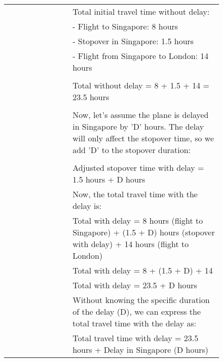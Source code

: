 \begin{figure}[!t]
{\begin{tabular}{>{\raggedleft\arraybackslash}p{0.3\linewidth} p{0.7\linewidth}}
    & Total initial travel time without delay: \\
    & - Flight to Singapore: 8 hours \\
    & - Stopover in Singapore: 1.5 hours \\
    & - Flight from Singapore to London: 14 hours \\ \\
    & Total without delay = 8 + 1.5 + 14 = 23.5 hours \\ \\
    & Now, let's assume the plane is delayed in Singapore by 'D' hours. The delay will only affect the stopover time, so we add 'D' to the stopover duration: \\ \\
    & Adjusted stopover time with delay = 1.5 hours + D hours\\
    & Now, the total travel time with the delay is: \\
    & Total with delay = 8 hours (flight to Singapore) + (1.5 + D) hours (stopover with delay) + 14 hours (flight to London) \\
    & Total with delay = 8 + (1.5 + D) + 14 \\
    & Total with delay = 23.5 + D hours \\
    & Without knowing the specific duration of the delay (D), we can express the total travel time with the delay as: \\
    & Total travel time with delay = 23.5 hours + Delay in Singapore (D hours) \\
    \bottomrule
    \end{tabular} }  
\end{figure}

\clearpage
\newpage
